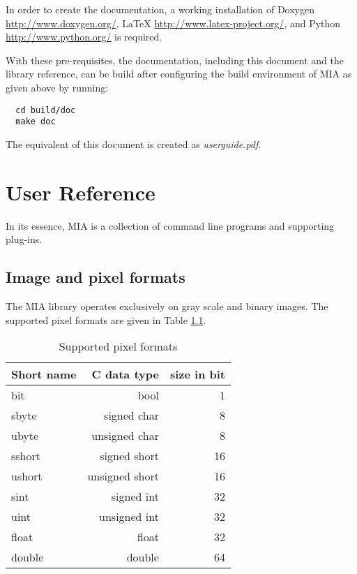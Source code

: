 \documentclass[english, 10pt, a4paper,headsepline,openany]{book}
\begin{document}
In order to create the documentation, a working installation of Doxygen \url{http://www.doxygen.org/}, 
  LaTeX \url{http://www.latex-project.org/}, and Python \url{http://www.python.org/} is required. 

With these pre-requisites, the documentation, including this document and the library reference, 
  can be build after configuring the build environment of MIA as given above by running: 
\lstset{language=bash}
\begin{lstlisting}
  cd build/doc 
  make doc 
\end{lstlisting}
 
The equivalent of this document is created as \emph{userguide.pdf}. 

\chapter{User Reference}


In its essence, MIA is a collection of command line programs and supporting plug-ins. 


\section{Image and pixel formats}

The MIA library operates exclusively on gray scale and binary images. 
The supported pixel formats are given in Table \ref{tab:pixform}. 

\begin{table}[h]
\caption{\label{tab:pixform}Supported pixel formats}
\begin{tabular}{lrr}
Short name & C data type & size in bit \\
\hline 
\hline 
bit    & bool          & 1  \\
\hline 
sbyte  & signed char   & 8  \\ 
\hline 
ubyte  & unsigned char & 8  \\ 
\hline 
sshort & signed short  & 16 \\
\hline 
ushort & unsigned short& 16 \\
\hline 
sint   & signed int    & 32 \\
\hline 
uint   & unsigned int  & 32 \\
\hline 
float  & float         & 32 \\
\hline 
double & double        & 64 \\
\hline 
\end{tabular}
\end{table}
\end{document}
